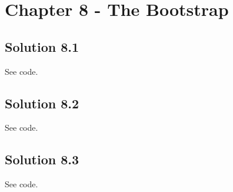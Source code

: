 \section*{Chapter 8 - The Bootstrap}

\subsection*{Solution 8.1}

See code.


\subsection*{Solution 8.2}

See code.


\subsection*{Solution 8.3}

See code.
